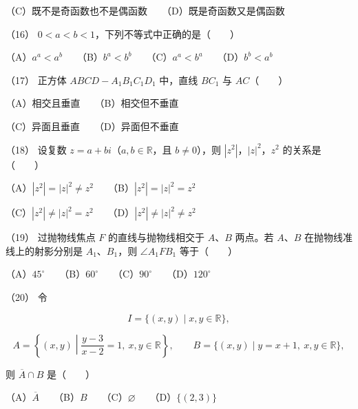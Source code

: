 \begin{question}
（C）既不是奇函数也不是偶函数　　（D）既是奇函数又是偶函数

（16） $0<a<b<1$，下列不等式中正确的是\mbox{（　　）}

（A）$a^a<a^b$　　（B）$b^a<b^b$　　（C）$a^a<b^a$　　（D）$b^b<a^b$

（17） 正方体 $ABCD-A_1B_1C_1D_1$ 中，直线 $BC_1$ 与 $AC$\mbox{（　　）}

（A）相交且垂直　　（B）相交但不垂直

（C）异面且垂直　　（D）异面但不垂直

（18） 设复数 $z=a+bi$（$a,b\in\mathbb R$，且 $b\ne0$），则 $|z^2|$，$|z|^2$，$z^2$ 的关系是\mbox{（　　）}

（A）$|z^2|=|z|^2\ne z^2$　　（B）$|z^2|=|z|^2=z^2$

（C）$|z^2|\ne|z|^2=z^2$　　（D）$|z^2|\ne|z|^2\ne z^2$

（19） 过抛物线焦点 $F$ 的直线与抛物线相交于 $A\text{、}B$ 两点。若 $A\text{、}B$ 在抛物线准线上的射影分别是 $A_1\text{、}B_1$，则 $\angle A_1FB_1$ 等于\mbox{（　　）}

（A）$45^\circ$　　（B）$60^\circ$　　（C）$90^\circ$　　（D）$120^\circ$

（20） 令

\nopagebreak[4]
\[
I=\{(x,y)\mid x,y\in\mathbb R\},
\]

\nopagebreak[4]
\[
A=\left\{(x,y)\middle|\frac{y-3}{x-2}=1,\ x,y\in\mathbb R\right\},
\qquad
B=\{(x,y)\mid y=x+1,\ x,y\in\mathbb R\},
\]

则 $\overline A\cap B$ 是\mbox{（　　）}

（A）$\overline A$　　（B）$B$　　（C）$\varnothing$　　（D）$\{(2,3)\}$

\end{question}
